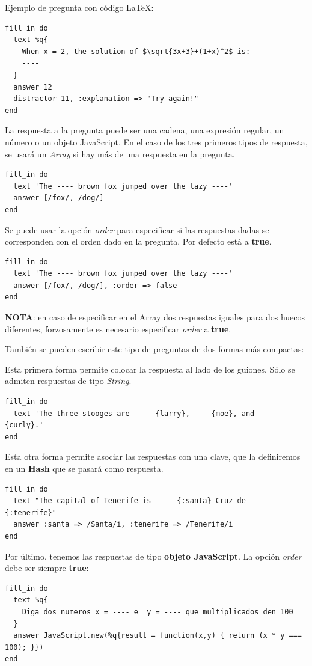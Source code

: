 Ejemplo de pregunta con c\'odigo LaTeX:
\begin{verbatim}
fill_in do
  text %q{
    When x = 2, the solution of $\sqrt{3x+3}+(1+x)^2$ is:
    ----
  }
  answer 12
  distractor 11, :explanation => "Try again!"
end
\end{verbatim}
\bigskip

La respuesta a la pregunta puede ser una cadena, una expresi\'on regular, un n\'umero o un objeto JavaScript. En el caso de los tres primeros tipos de respuesta, se usar\'a
un \textit{Array} si hay m\'as de una respuesta en la pregunta.
\begin{verbatim}
fill_in do
  text 'The ---- brown fox jumped over the lazy ----'
  answer [/fox/, /dog/]
end
\end{verbatim}
\bigskip

Se puede usar la opci\'on \textit{order} para especificar si las respuestas dadas se corresponden con el orden dado en la pregunta. Por defecto est\'a a {\bfseries true}.
\begin{verbatim}
fill_in do
  text 'The ---- brown fox jumped over the lazy ----'
  answer [/fox/, /dog/], :order => false
end
\end{verbatim}

{\bfseries NOTA}: en caso de especificar en el Array dos respuestas iguales para dos huecos diferentes, forzosamente es necesario especificar \textit{order} a {\bfseries true}.
\bigskip

Tambi\'en se pueden escribir este tipo de preguntas de dos formas m\'as compactas:

Esta primera forma permite colocar la respuesta al lado de los guiones. S\'olo se admiten respuestas de tipo \textit{String}.
\begin{verbatim}
fill_in do
  text 'The three stooges are -----{larry}, ----{moe}, and -----{curly}.'
end
\end{verbatim}
\bigskip

Esta otra forma permite asociar las respuestas con una clave, que la definiremos en un {\bfseries Hash} que se pasar\'a como respuesta.
\begin{verbatim}
fill_in do
  text "The capital of Tenerife is -----{:santa} Cruz de --------{:tenerife}"
  answer :santa => /Santa/i, :tenerife => /Tenerife/i
end
\end{verbatim}
\bigskip

Por \'ultimo, tenemos las respuestas de tipo {\bfseries objeto JavaScript}. La opci\'on \textit{order} debe ser siempre {\bfseries true}:
\begin{verbatim}
fill_in do
  text %q{
    Diga dos numeros x = ---- e  y = ---- que multiplicados den 100
  }
  answer JavaScript.new(%q{result = function(x,y) { return (x * y === 100); }})
end
\end{verbatim}

